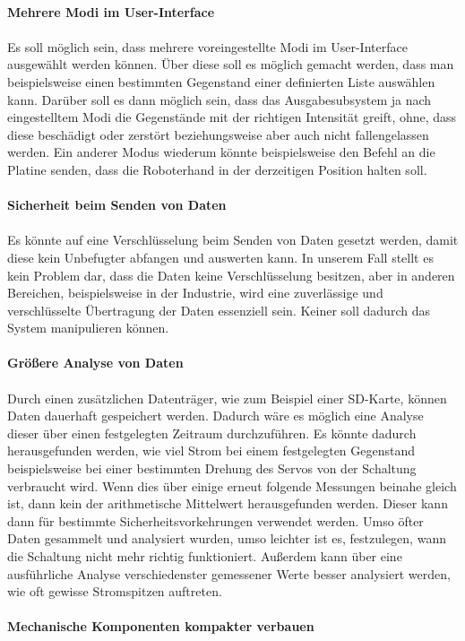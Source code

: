 \documentclass[titlepage,12pt,twoside]{article}
\begin{document}
\\
\textbf{Mehrere Modi im User-Interface} \\
\\
Es soll möglich sein, dass mehrere voreingestellte Modi im User-Interface ausgewählt werden können. 
Über diese soll es möglich gemacht werden, dass man beispielsweise einen bestimmten Gegenstand 
einer definierten Liste auswählen kann. Darüber soll es dann möglich sein, dass das Ausgabesubsystem 
ja nach eingestelltem Modi die Gegenstände mit der richtigen Intensität greift, ohne, dass diese 
beschädigt oder zerstört beziehungsweise aber auch nicht fallengelassen werden. Ein anderer Modus 
wiederum könnte beispielsweise den Befehl an die Platine senden, dass die Roboterhand in der 
derzeitigen Position halten soll. \\
\\
\textbf{Sicherheit beim Senden von Daten} \\
\\
Es könnte auf eine Verschlüsselung beim Senden von Daten gesetzt werden, damit diese kein 
Unbefugter abfangen und auswerten kann. In unserem Fall stellt es kein Problem dar, dass die 
Daten keine Verschlüsselung besitzen, aber in anderen Bereichen, beispielsweise in der Industrie, 
wird eine zuverlässige und verschlüsselte Übertragung der Daten essenziell sein. Keiner soll 
dadurch das System manipulieren können. \\
\\
\textbf{Größere Analyse von Daten} \\
\\
Durch einen zusätzlichen Datenträger, wie zum Beispiel einer SD-Karte, können Daten dauerhaft 
gespeichert werden. Dadurch wäre es möglich eine Analyse dieser über einen festgelegten Zeitraum 
durchzuführen. Es könnte dadurch herausgefunden werden, wie viel Strom bei einem festgelegten 
Gegenstand beispielsweise bei einer bestimmten Drehung des Servos von der Schaltung verbraucht 
wird. Wenn dies über einige erneut folgende Messungen beinahe gleich ist, dann kein der 
arithmetische Mittelwert herausgefunden werden. Dieser kann dann für bestimmte 
Sicherheitsvorkehrungen verwendet werden. Umso öfter Daten gesammelt und analysiert wurden, umso 
leichter ist es, festzulegen, wann die Schaltung nicht mehr richtig funktioniert. Außerdem kann 
über eine ausführliche Analyse verschiedenster gemessener Werte besser analysiert werden, wie oft 
gewisse Stromspitzen auftreten. \\
\\
\textbf{Mechanische Komponenten kompakter verbauen} \\
\end{document}
